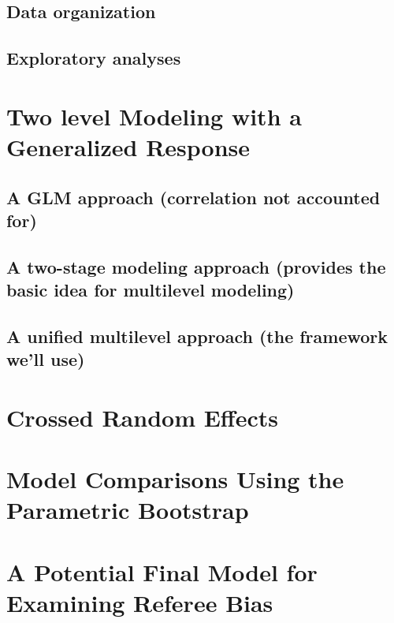 \documentclass[
]{krantz}
\begin{document}
\hypertarget{data-organization-5}{%
\subsection{Data organization}\label{data-organization-5}}

\hypertarget{glmm-eda}{%
\subsection{Exploratory analyses}\label{glmm-eda}}

\hypertarget{twolevelmodeling-glmm}{%
\section{Two level Modeling with a Generalized Response}\label{twolevelmodeling-glmm}}

\hypertarget{multregr-glmm}{%
\subsection{A GLM approach (correlation not accounted for)}\label{multregr-glmm}}

\hypertarget{twostage-glmm}{%
\subsection{A two-stage modeling approach (provides the basic idea for multilevel modeling)}\label{twostage-glmm}}

\hypertarget{unified-glmm}{%
\subsection{A unified multilevel approach (the framework we'll use)}\label{unified-glmm}}

\hypertarget{crossedre}{%
\section{Crossed Random Effects}\label{crossedre}}

\hypertarget{glmm-paraboot}{%
\section{Model Comparisons Using the Parametric Bootstrap}\label{glmm-paraboot}}

\hypertarget{sec:finalmodel-glmm}{%
\section{A Potential Final Model for Examining Referee Bias}\label{sec:finalmodel-glmm}}
\end{document}
